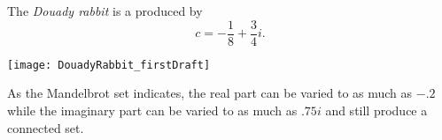 \documentclass[12pt]{article}
\begin{document}
The {\em Douady rabbit} is a  produced by $$c = -\frac{1}{8} + \frac{3}{4}i.$$

\begin{center}
\texttt{[image: DouadyRabbit\_firstDraft]}
\end{center}

As the Mandelbrot set indicates, the real part can be varied to as much as $-.2$ while the imaginary part can be varied to as much as $.75i$ and still produce a connected set.

\end{document}
